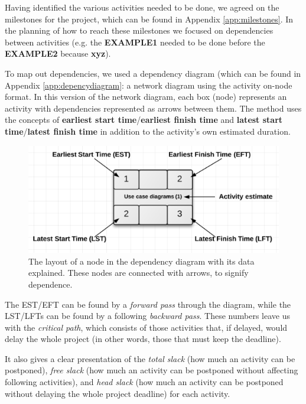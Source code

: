 Having identified the various activities needed to be done, we agreed on the milestones for the project, which can be found in Appendix \ref{app:milestones}.
In the planning of how to reach these milestones we focused on dependencies
between activities (e.g. the \textbf{EXAMPLE1} needed to be done before the
\textbf{EXAMPLE2} because \textbf{xyz}).

To map out dependencies, we used a dependency diagram (which can be found in Appendix
\ref{app:depencydiagram}: a network diagram using the activity on-node format\cite{caye}.
In this version of the network diagram, each box (node) represents an activity with
dependencies represented as arrows between them. The method uses the concepts of
\textbf{earliest start time}/\textbf{earliest finish time} and \textbf{latest start
time}/\textbf{latest finish time} in addition to the activity’s own estimated duration.

\begin{figure}[hbtp]
    \includegraphics[scale=0.5]{./Empiri/Planning/img/networkdiagramnotation.png}
    \caption{The layout of a node in the dependency diagram with its data explained. These nodes are connected with arrows, to signify dependence.}
\end{figure}
 
The EST/EFT can be found by a \emph{forward pass} through the diagram, while the LST/LFTs
can be found by a following \emph{backward pass}. These numbers leave us with the
\emph{critical path}, which consists of those activities that, if delayed, would delay
the whole project (in other words, those that must keep the deadline).

It also gives a clear presentation of the \emph{total slack} (how much an activity can
be postponed), \emph{free slack} (how much an activity can be postponed without affecting
following activities), and \emph{head slack} (how much an activity can be postponed without
delaying the whole project deadline) for each activity.